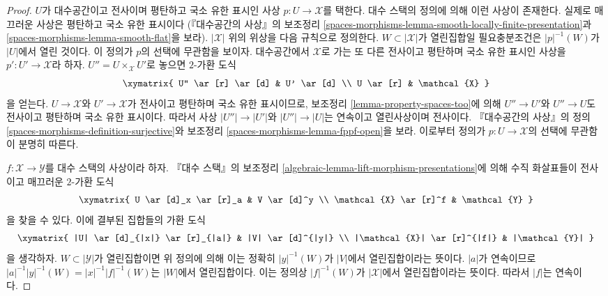 \begin{proof}
$U$가 대수공간이고 전사이며 평탄하고 국소 유한 표시인 사상
$p : U \to \mathcal{X}$를 택한다. 대수 스택의 정의에 의해
이런 사상이 존재한다. 실제로 매끄러운 사상은 평탄하고 국소 유한 표시이다
(『대수공간의 사상』의 보조정리
\ref{spaces-morphisms-lemma-smooth-locally-finite-presentation}과
\ref{spaces-morphisms-lemma-smooth-flat}을 보라).
$|\mathcal{X}|$ 위의 위상을 다음 규칙으로 정의한다.
$W \subset |\mathcal{X}|$가 열린집합일 필요충분조건은
$|p|^{-1}(W)$가 $|U|$에서 열린 것이다. 이 정의가 $p$의 선택에
무관함을 보이자. 대수공간에서 $\mathcal{X}$로 가는 또 다른 전사이고
평탄하며 국소 유한 표시인 사상을 $p' : U' \to \mathcal{X}$라 하자.
$U'' = U \times_\mathcal{X} U'$로 놓으면 $2$-가환 도식
$$
\xymatrix{
U'' \ar[r] \ar[d] & U' \ar[d] \\
U \ar[r] & \mathcal{X}
}
$$
을 얻는다. $U \to \mathcal{X}$와 $U' \to \mathcal{X}$가 전사이고
평탄하며 국소 유한 표시이므로, 보조정리
\ref{lemma-property-spaces-too}에 의해
$U'' \to U'$와 $U'' \to U$도 전사이고 평탄하며 국소 유한 표시이다.
따라서 사상 $|U''| \to |U'|$와 $|U''| \to |U|$는 연속이고 열린사상이며
전사이다. 『대수공간의 사상』의 정의
\ref{spaces-morphisms-definition-surjective}와 보조정리
\ref{spaces-morphisms-lemma-fppf-open}을 보라.
이로부터 정의가 $p : U \to \mathcal{X}$의 선택에 무관함이 분명히 따른다.

\medskip\noindent
$f : \mathcal{X} \to \mathcal{Y}$를 대수 스택의 사상이라 하자.
『대수 스택』의 보조정리
\ref{algebraic-lemma-lift-morphism-presentations}에 의해
수직 화살표들이 전사이고 매끄러운 $2$-가환 도식
$$
\xymatrix{
U \ar[d]_x \ar[r]_a & V \ar[d]^y \\
\mathcal{X} \ar[r]^f & \mathcal{Y}
}
$$
을 찾을 수 있다. 이에 결부된 집합들의 가환 도식
$$
\xymatrix{
|U| \ar[d]_{|x|} \ar[r]_{|a|} & |V| \ar[d]^{|y|} \\
|\mathcal{X}| \ar[r]^{|f|} & |\mathcal{Y}|
}
$$
을 생각하자. $W \subset |\mathcal{Y}|$가 열린집합이면 위 정의에 의해
이는 정확히 $|y|^{-1}(W)$가 $|V|$에서 열린집합이라는 뜻이다.
$|a|$가 연속이므로
$|a|^{-1}|y|^{-1}(W) = |x|^{-1}|f|^{-1}(W)$는 $|W|$에서 열린집합이다.
이는 정의상 $|f|^{-1}(W)$가 $|\mathcal{X}|$에서 열린집합이라는 뜻이다.
따라서 $|f|$는 연속이다.


\end{proof}
